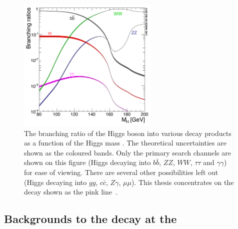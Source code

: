 \begin{figure}
  \includegraphics[width=0.6\textwidth]{theory/plots/Higgs_BR_LM}
  \caption[\acs{SM} Higgs branching fraction]{The branching ratio of the \SM Higgs boson into various decay products as a function of the Higgs mass \mH. The theoretical uncertainties are shown as the coloured bands. Only the primary search channels are shown on this figure (Higgs decaying into $b\bar{b}$, $ZZ$, $WW$, $\tau\tau$ and $\gamma\gamma$) for ease of viewing. There are several other possibilities left out (Higgs decaying into $gg$, $c\bar{c}$, $Z\gamma$, $\mu\mu$). This thesis concentrates on the \Hgg decay shown as the pink line~\cite{LHCHiggsCrossSectionWorkingGroup3}.}
  \label{fig:higgs_br}
\end{figure}

\subsection{Backgrounds to the \Hgg decay at the \LHC}


